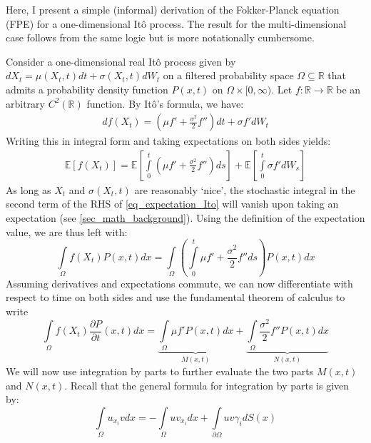 Here, I present a simple (informal) derivation of the Fokker-Planck equation (FPE) for a one-dimensional It\^{o} process. The result for the multi-dimensional case follows from the same logic but is more notationally cumbersome.

Consider a one-dimensional real It\^{o} process given by $dX_t = \mu(X_t,t)dt + \sigma(X_t,t)dW_t$ on a filtered probability space $\Omega \subseteq \mathbb{R}$ that admits a probability density function $P(x,t)$ on $\Omega \times [0,\infty)$. Let $f:\mathbb{R}\to\mathbb{R}$ be an arbitrary $C^2(\mathbb{R})$ function. By It\^{o}'s formula, we have:
\begin{align*}
    df(X_t) = \left(\mu f' + \frac{\sigma^2}{2}f''\right)dt + \sigma f' dW_t
\end{align*}
Writing this in integral form and taking expectations on both sides yields:
\begin{align}
\label{eq_expectation_Ito}
    \mathbb{E}[f(X_t)] = \mathbb{E}\left[\int\limits_{0}^{t}\left(\mu f' + \frac{\sigma^2}{2}f''\right)ds\right] + \mathbb{E}\left[\int\limits_{0}^{t}\sigma f' dW_s\right]
\end{align}
As long as $X_t$ and $\sigma(X_t,t)$ are reasonably `nice', the stochastic integral in the second term of the RHS of \eqref{eq_expectation_Ito} will vanish upon taking an expectation (see \ref{sec_math_background}). Using the definition of the expectation value, we are thus left with:
\begin{equation*}
    \int\limits_{\Omega}f(X_t)P(x,t)dx = \int\limits_{\Omega}\left(\int\limits_{0}^{t}\mu f' + \frac{\sigma^2}{2}f''ds\right)P(x,t)dx
\end{equation*}
Assuming derivatives and expectations commute, we can now differentiate with respect to time on both sides and use the fundamental theorem of calculus to write
\begin{equation}
\label{eq_Ito_to_FPE_for_parts}
\int\limits_{\Omega}f(X_t)\frac{\partial P}{\partial t}(x,t)dx = \underbrace{\int\limits_{\Omega}\mu f'P(x,t)dx}_{M(x,t)} + \underbrace{\int\limits_{\Omega}\frac{\sigma^2}{2}f''P(x,t)dx}_{N(x,t)}
\end{equation}
We will now use integration by parts to further evaluate the two parts $M(x,t)$ and $N(x,t)$. Recall that the general formula for integration by parts is given by:
\begin{equation*}
    \int\limits_{\Omega}u_{x_i}vdx = -\int\limits_{\Omega}uv_{x_i}dx + \int\limits_{\partial\Omega}uv\gamma_{i}dS(x)
\end{equation*}
